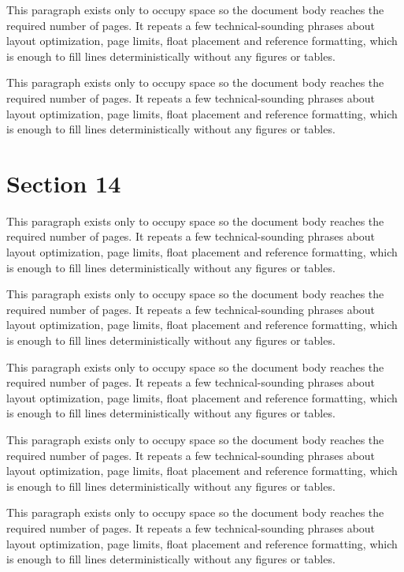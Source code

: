 \documentclass[10pt,letterpaper]{article}
\begin{document}
This paragraph exists only to occupy space so the document body reaches the required number of pages. It repeats a few technical-sounding phrases about layout optimization, page limits, float placement and reference formatting, which is enough to fill lines deterministically without any figures or tables.

This paragraph exists only to occupy space so the document body reaches the required number of pages. It repeats a few technical-sounding phrases about layout optimization, page limits, float placement and reference formatting, which is enough to fill lines deterministically without any figures or tables.

\section{Section 14}
This paragraph exists only to occupy space so the document body reaches the required number of pages. It repeats a few technical-sounding phrases about layout optimization, page limits, float placement and reference formatting, which is enough to fill lines deterministically without any figures or tables.

This paragraph exists only to occupy space so the document body reaches the required number of pages. It repeats a few technical-sounding phrases about layout optimization, page limits, float placement and reference formatting, which is enough to fill lines deterministically without any figures or tables.

This paragraph exists only to occupy space so the document body reaches the required number of pages. It repeats a few technical-sounding phrases about layout optimization, page limits, float placement and reference formatting, which is enough to fill lines deterministically without any figures or tables.

This paragraph exists only to occupy space so the document body reaches the required number of pages. It repeats a few technical-sounding phrases about layout optimization, page limits, float placement and reference formatting, which is enough to fill lines deterministically without any figures or tables.

This paragraph exists only to occupy space so the document body reaches the required number of pages. It repeats a few technical-sounding phrases about layout optimization, page limits, float placement and reference formatting, which is enough to fill lines deterministically without any figures or tables.
\end{document}
